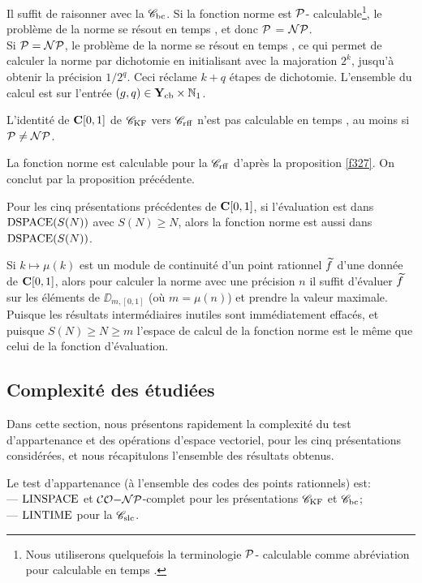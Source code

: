 \proof 
Il suffit de raisonner avec la \pres  ${{{\mathscr C}}_{\rm bc}}$. Si la fonction norme est  ${\cal P}$-
calculable{\footnote{Nous utiliserons quelquefois la terminologie  ${\cal P}$-
calculable   comme abréviation pour  calculable en temps \poll.}}, le 
problème de la norme se résout en temps \poll, et donc  ${\cal P}$ = ${\cal NP}$.\\
Si  ${\cal P} = {\cal NP}$, le problème de la norme se résout en temps \poll, ce 
qui permet de calculer la norme par dichotomie en initialisant avec la 
majoration $2^k$, jusqu'à obtenir la précision  $1/2^q$. Ceci réclame  
$k+q$ étapes de dichotomie. 
L'ensemble du calcul est \etpo sur l'entrée  
$(g,q) \in {{\bf Y}_{\rm cb}}  \times \mathbb {N}_1$.  \eop

\begin{fcorollary} \label{f435}
L'identité de  ${{\bf C}[0,1]}$  de  ${{{\mathscr C}}_{\rm KF}}$  vers  ${{{\mathscr C}}_{\rm rff}}$  n'est pas calculable en temps 
\poll, au moins si  ${\cal P} \neq {\cal NP}$.
\end{fcorollary}

\proof 
La fonction norme est calculable \etpo pour la \pres  ${{{\mathscr C}}_{\rm rff}}$  d'après la 
proposition  \ref{f327}.  On conclut par la proposition précédente.  \eop 

\begin{fproposition} \label{f436}
Pour les cinq présentations précédentes de ${{\bf C}[0,1]}$, si l'évaluation est 
dans  ${\rm DSPACE}(S(N))$  avec $S(N) \geq N$, alors la fonction norme est aussi dans 
${\rm DSPACE}(S(N))$.
\end{fproposition}

\proof 
Si   $k \mapsto \mu(k)$  est un module de continuité d'un point rationnel  
$\widetilde{f}$    d'une \pres donnée de ${{\bf C}[0,1]}$, alors pour calculer la norme 
avec une précision  $n$  il suffit d'évaluer  $\widetilde{f}$    sur les 
éléments de $\DD_{m,[0,1]}$  (où  $ m = \mu(n)$)  et prendre la valeur 
maximale. 
Puisque les résultats intermédiaires inutiles sont immédiatement 
effacés, et puisque  $S(N) \geq N \geq m$ l'espace de calcul de la fonction 
norme est le même que celui de la fonction d'évaluation.  \eop


\subsection{Complexité des \rps  étudiées}\label{fsubsec44}
Dans cette section, nous présentons rapidement la complexité du test 
d'appartenance et des opérations d'espace vectoriel, pour les cinq 
présentations considérées, et nous récapitulons l'ensemble des 
résultats obtenus. 

\begin{fproposition} \label{f441}
Le test d'appartenance (à l'ensemble des codes des points rationnels) est:\\
--- ${\rm LINSPACE}$  et ${\cal CO}{\rm-}{\cal NP}$-complet pour les présentations  ${{{\mathscr C}}_{\rm KF}}$ et  ${{{\mathscr C}}_{\rm bc}}$;  \\
--- ${\rm LINTIME} $ pour la \pres ${{{\mathscr C}}_{\rm slc}}$.
\end{fproposition}

